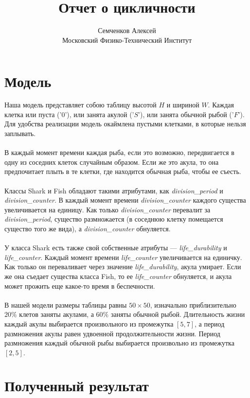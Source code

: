 \documentclass{article}
\begin{document}
\title {Отчет о цикличности}
\author {Семченков Алексей\\Московский Физико-Технический Институт}
\maketitle

\section{Модель}

Наша модель представляет собою таблицу высотой $H$ и шириной $W$. Каждая клетка или пуста ('$0$'), или занята акулой ('$S$'), или занята обычной рыбой ('$F$'). Для удобства реализации модель окаймлена пустыми клетками, в которые нельзя заплывать. \\\\
В каждый момент времени каждая рыба, если это возможно, передвигается в одну из соседних клеток случайным образом. Если же это акула, то она предпочитает плыть в те клетки, где находится обычная рыба, чтобы ее съесть.\\\\
Классы Shark и Fish обладают такими атрибутами, как \textit{division\_period} и \textit{division\_counter}. В каждый момент времени \textit{division\_counter} каждого существа увеличивается на единицу. Как только \textit{division\_counter} перевалит за \textit{division\_period}, существо размножается (в соседнюю клетку помещается существо того же вида), а \textit{division\_counter} обнуляется.\\\\
У класса Shark есть также свой собственные атрибуты --- \textit{life\_durability} и \textit{life\_counter}. Каждый момент времени \textit{life\_counter} увеличивается на единичку. Как только он переваливает через значение \textit{life\_durability}, акула умирает. Если же она съедает существа класса Fish, то ее \textit{life\_counter} обнуляется, и акула может прожить еще какое-то время в беспечности. \\\\
В нашей модели размеры таблицы равны $50\times 50$, изначально приблизительно $20\%$ клетов заняты акулами, а $60\%$ заняты обычной рыбой. Длительность жизни каждый акулы выбирается произвольного из промежутка $[5,7]$, а период размножения акулы равен удвоенной продолжительности жизни. Период размножения каждый обычной рыбы выбирается произвольно из промежутка $[2, 5]$.

\section{Полученный результат}
\end{document}
